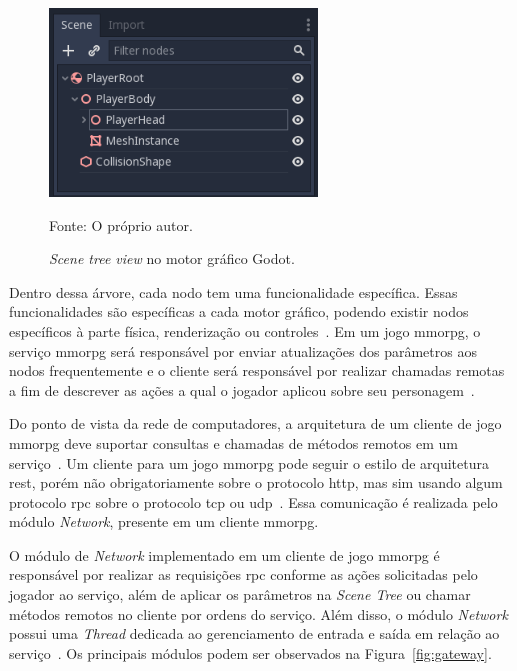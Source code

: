 \begin{figure}[htb!]
\caption{\textit{Scene tree view} no motor gráfico Godot.}
\label{fig:scene_tree}
\includegraphics[height=5cm]{img/cap2/scene_tree.png}
\centering

Fonte: O próprio autor.
\end{figure}



Dentro dessa árvore, cada nodo tem uma funcionalidade específica.
%
Essas funcionalidades são específicas a cada motor gráfico, podendo existir nodos específicos à parte física, renderização ou controles~\cite{godot_docs}.
%
Em um jogo \ac{mmorpg}, o serviço \ac{mmorpg} será responsável por enviar atualizações dos parâmetros aos nodos frequentemente e o cliente será responsável por realizar chamadas remotas a fim de descrever as ações a qual o jogador aplicou sobre seu personagem~\cite{photon_engine}.


Do ponto de vista da rede de computadores, a arquitetura de um cliente de jogo \ac{mmorpg} deve suportar consultas e chamadas de métodos remotos em um serviço~\cite{albion_online_unite}.
%
Um cliente para um jogo \ac{mmorpg} pode seguir o estilo de arquitetura \ac{rest}, porém não obrigatoriamente sobre o protocolo \ac{http}, mas sim usando algum protocolo \ac{rpc} sobre o protocolo \ac{tcp} ou \ac{udp}~\cite{albion_online_unite, stephenclarkewillson2017}.
%
Essa comunicação é realizada pelo módulo \textit{Network}, presente em um cliente \ac{mmorpg}.


O módulo de \textit{Network} implementado em um cliente de jogo \ac{mmorpg} é responsável por realizar as requisições \ac{rpc} conforme as ações solicitadas pelo jogador ao serviço, além de aplicar os parâmetros na \textit{Scene Tree} ou chamar métodos remotos no cliente por ordens do serviço.
%
Além disso, o módulo \textit{Network} possui uma \textit{Thread} dedicada ao gerenciamento de entrada e saída em relação ao serviço~\cite{albion_online_unite}.
%
Os principais módulos podem ser observados na Figura~\ref{fig:gateway}.


